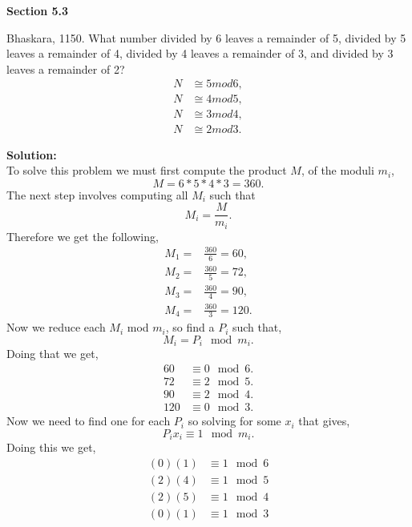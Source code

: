 \documentclass[12pt]{article}
\makeatletter
\theoremstyle{homework}
\newenvironment{exercise}[1]
{\def\@currentlabel{#1}\exercisecore}
{\endexercisecore}
\newcommand{\localhead}[1]{\par\smallskip\noindent\textbf{#1}\nobreak\\}%
\newcommand\solution{\localhead{Solution:}}
\makeatother
\begin{document}
\textbf{Section 5.3}

\begin{exercise}{21} Bhaskara, 1150. What number divided by 6 leaves a remainder of 5, divided by 5
  leaves a remainder of 4, divided by 4 leaves a remainder of 3, and divided by 3 leaves a remainder of 2? \\
  \begin{align*}
    N &\cong 5 mod 6,\\
    N &\cong 4 mod 5,\\
    N &\cong 3 mod 4,\\
    N &\cong 2 mod 3.
  \end{align*}
  \solution To solve this problem we must first compute the product $M$, of the moduli $m_i$,
  \begin{equation*}
    M = 6*5*4*3 = 360.
  \end{equation*}
  The next step involves computing all $M_i$ such that 
  \begin{equation*}
    M_i = \frac{M}{m_i}.
  \end{equation*}
  Therefore we get the following, 
\begin{align*}
  M_1 = &\frac{360}{6} = 60, \\
  M_2 = &\frac{360}{5} =72, \\
  M_3 = &\frac{360}{4} =90, \\
  M_4 = &\frac{360}{3} =120.
\end{align*}
Now we reduce each $M_i$ mod $m_i$, so find a $P_i$ such that, 
\begin{equation*}
  M_i = P_i \mod m_i.
\end{equation*}
Doing that we get,
\begin{align*}
  60 &\equiv 0 \mod 6.\\
  72 &\equiv 2 \mod 5.\\
  90 &\equiv 2 \mod 4.\\
  120 &\equiv 0 \mod 3.
\end{align*}
Now we need to find one for each $P_i$ so solving for some $x_i$ that gives, 
\begin{equation*}
  P_ix_i \equiv 1 \mod m_i.
\end{equation*}
 Doing this we get, 
\begin{align*}
 (0)(1) &\equiv 1 \mod 6\\
 (2)(4) &\equiv 1 \mod 5\\
 (2)(5) &\equiv 1 \mod 4\\
 (0)(1) &\equiv 1 \mod 3
\end{align*}
\end{exercise}
\vspace{.5in}
\end{document}
